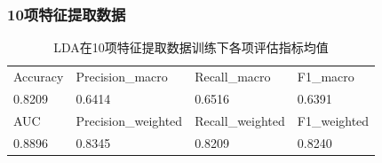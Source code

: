 \documentclass[10pt]{article}
\begin{document}
\subsubsection*{10项特征提取数据}
\begin{table}[H]
  \centering
  \caption{LDA在10项特征提取数据训练下各项评估指标均值}
  \begin{tabular}{llll}
  \toprule
  Accuracy & Precision\_macro & Recall\_macro & F1\_macro \\
  0.8209 & 0.6414 & 0.6516 & 0.6391 \\
  \midrule
  AUC & Precision\_weighted & Recall\_weighted & F1\_weighted \\
  0.8896 & 0.8345 & 0.8209 & 0.8240 \\
  \bottomrule
  \end{tabular}
\end{table}
\end{document}

